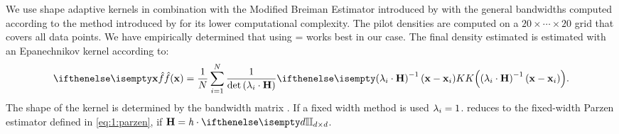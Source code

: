 
	We use shape adaptive kernels in combination with the Modified Breiman Estimator introduced by \textcite{wilkinson1995dataplot} 
	with the general bandwidths computed according to the method introduced by \textcite{ferdosi2011comparison} for its lower computational complexity.
	The pilot densities are computed on a $20 \times \cdots \times 20$ grid that covers all data points.
	We have empirically determined  that using \varMBESensitivityParam =  works best in our case. 
	The final density estimated is estimated with an Epanechnikov kernel according to:
	\begin{equation}\label{eq:2:parzenWithBandWidthMatrix}
		\varEstimatedDensityFunction{\varPattern} = \frac{1}{\varNumPatterns}\sum_{\itXis = 1}^{\varNumPatterns} \frac{1}{\det\left(\varLocalBandwidth{\itXis} \cdot \varBandwidthMatrix\right)}\varKernel{\left(\varLocalBandwidth{\itXis} \cdot \varBandwidthMatrix\right)^{-1}\left(\varPattern - \varPattern[\itXis]\right)}.
	\end{equation}
	The shape of the kernel \varKernel{\bullet} is determined by the bandwidth matrix \varBandwidthMatrix. If a fixed width method is used $\lambda_{i} = 1$.  reduces to the fixed-width Parzen estimator defined in \cref{eq:1:parzen}, if $\varBandwidthMatrix = \varBandwidth \cdot \identityMatrix{\varDim}$.
	
